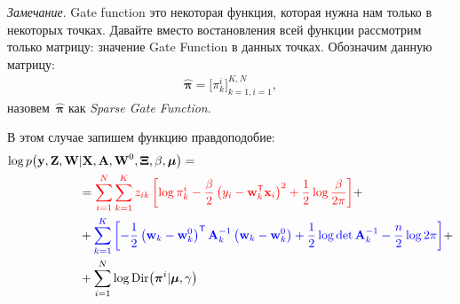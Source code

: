 \documentclass[12pt, twoside]{article}
\numberwithin{equation}{section}
\begin{document}
\textit{Замечание}. Gate function это некоторая функция, которая нужна нам только в некоторых точках. Давайте вместо востановления всей функции рассмотрим только матрицу: значение Gate Function в данных точках. Обозначим данную матрицу:
\[
\begin{aligned}
\hat{\bm{\pi}} = \bigr[\pi_k^i\bigr]_{k=1, i=1}^{K, N},
\end{aligned}
\]
назовем~$\hat{\bm{\pi}}$ как \textit{Sparse Gate Function}.

В этом случае запишем функцию правдоподобие:
\[
\label{eq:em:2}
\begin{aligned}
\log p\bigr(\mathbf{y}, \mathbf{Z}, \mathbf{W}&|\mathbf{X}, \textbf{A}, \textbf{W}^{0},  \bm{\Xi}, \beta, \bm{\mu}\bigr) =\\
&= {\color{red}\sum_{i=1}^{N}\sum_{k=1}^{K}z_{ik}\left[\log\pi_k^i - \frac{\beta}{2}\left(y_{i} - \textbf{w}_{k}^{\mathsf{T}}\textbf{x}_{i}\right)^{2} + \frac{1}{2}\log\frac{\beta}{2\pi}\right]} +\\
&+ {\color{blue}\sum_{k=1}^{K}\left[-\frac{1}{2}\left(\textbf{w}_{k} - \textbf{w}_{k}^{0}\right)^{\mathsf{T}}\textbf{A}_{k}^{-1}\left(\textbf{w}_{k} - \textbf{w}_{k}^{0}\right) + \frac{1}{2}\log\det\textbf{A}^{-1}_{k} - \frac{n}{2}\log2\pi\right]}+\\
&+  \sum_{i=1}^{N}\log\text{Dir}\bigr(\bm{\pi}^i|\bm{\mu}, \gamma\bigr) 
\end{aligned}
\]
\end{document}
